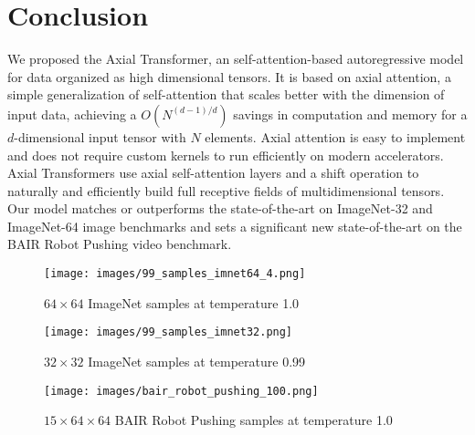 \documentclass{article} \usepackage{iclr2020_conference,times}
\begin{document}
\section{Conclusion}
We proposed the Axial Transformer, an self-attention-based autoregressive model for data organized as high dimensional tensors. It is based on axial attention, a simple generalization of self-attention that scales better with the dimension of input data, achieving a $O(N^{(d-1)/d})$ savings in computation and memory for a $d$-dimensional input tensor with $N$ elements. Axial attention is easy to implement and does not require custom kernels to run efficiently on modern accelerators. Axial Transformers use axial self-attention layers and a shift operation to naturally and efficiently build full receptive fields of multidimensional tensors. Our model matches or outperforms the state-of-the-art on ImageNet-32 and ImageNet-64 image benchmarks and sets a significant new state-of-the-art on the BAIR Robot Pushing video benchmark.



\begin{figure}[hp]
    \centering
    \texttt{[image: images/99\_samples\_imnet64\_4.png]}
    \caption{$64 \times 64$ ImageNet samples at temperature 1.0}
    \label{fig:imnet64}
\end{figure}

\begin{figure}[hp]
    \centering
    \texttt{[image: images/99\_samples\_imnet32.png]}
    \caption{$32\times 32$ ImageNet samples at temperature 0.99}
    \label{fig:imnet32}
\end{figure}

\begin{figure}[hp]
    \centering
    \texttt{[image: images/bair\_robot\_pushing\_100.png]}
    \caption{$15 \times 64\times 64$ BAIR Robot Pushing samples at temperature 1.0}
    \label{fig:bair}
\end{figure}



\FloatBarrier


\end{document}
